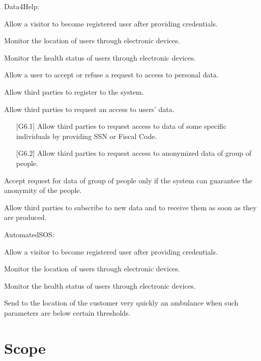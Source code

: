 Data4Help:  
\begin{enumerate} [label={[G\arabic*]}]
    \item Allow a visitor to become registered user after providing credentials.
    \item Monitor the location of users through electronic devices.
    \item Monitor the health status of users through electronic devices.
    \item Allow a user to accept or refuse a request to access to personal data.
    \item Allow third parties to register to the system.
    \item Allow third parties to request an access to users' data.
    \begin{enumerate} [label*={.\arabic*}]
        \item [{[G6.1]}] Allow third parties to request access to data of some specific individuals by providing SSN or Fiscal Code.
        \item [{[G6.2]}] Allow third parties to request access to anonymized data of group of people.
    \end{enumerate}
    \item Accept request for data of group of people only if the system can guarantee the anonymity of the people.
    \item Allow third parties to subscribe to new data and to receive them as soon as they are produced.
\end{enumerate}  
\noindent
AutomatedSOS:
\begin{enumerate} [resume, label={[G\arabic*]}]
    \item Allow a visitor to become registered user after providing credentials.
    \item Monitor the location of users through electronic devices.
    \item Monitor the health status of users through electronic devices.
    \item Send to the location of the customer very quickly an ambulance when such parameters are below certain thresholds. 
\end{enumerate}

\section{Scope}
